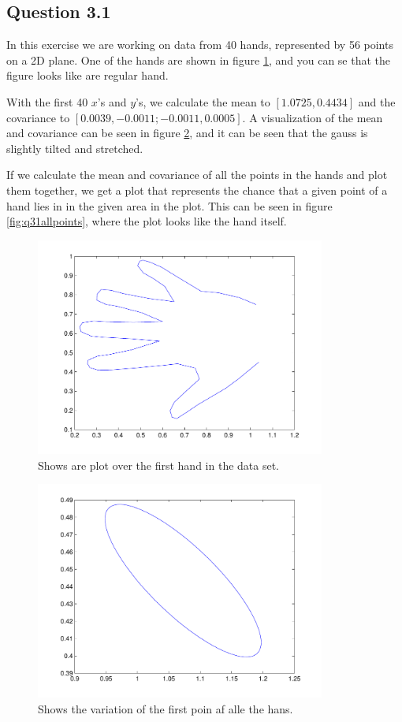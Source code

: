 \subsection*{Question 3.1}
In this exercise we are working on data from 40 hands, represented by 56
points on a 2D plane. One of the hands are shown in figure
\ref{fig:q31hand}, and you can se that the figure looks like are regular
hand.

With the first 40 $x$'s and $y$'s, we calculate the mean to $[1.0725, 0.4434]$ and the covariance to $[0.0039, -0.0011;
-0.0011, 0.0005]$. A visualization of the mean and covariance can be
seen in figure \ref{fig:q31onepoint}, and it can be seen that the gauss
is slightly tilted and stretched.

If we calculate the mean and covariance of all the points in the hands and
plot them together, we get a plot that represents the chance that a given
point of a hand lies in in the given area in the plot. This can be seen in
figure \ref{fig:q31allpoints}, where the plot looks like the hand itself.

\begin{figure}[!htbp]
  \centering
  \includegraphics[width=0.85\textwidth]{./images/q31_hand}
  \caption{Shows are plot over the first hand in the data set.}
  \label{fig:q31hand}
\end{figure}

\begin{figure}[!htbp]
  \centering
  \includegraphics[width=0.85\textwidth]{./images/q31_2}
  \caption{Shows the variation of the first poin af alle the hans.}
  \label{fig:q31onepoint}
\end{figure}

